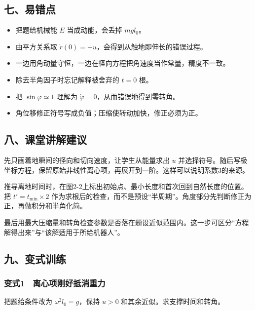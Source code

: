 \documentclass[12pt,a4paper,fontset=fandol]{ctexart}
\providecommand{\tightlist}{\setlength{\itemsep}{0pt}\setlength{\parskip}{0pt}}
\begin{document}
\subsection{七、易错点}\label{ux4e03ux6613ux9519ux70b9-1}

\begin{itemize}
\tightlist
\item
  把题给机械能 \(E\) 当成动能，会丢掉 \(mgl_0\)。
\item
  由平方关系取 \(\dot r(0)=+u\)，会得到从触地即伸长的错误过程。
\item
  一边用角动量守恒，一边在径向方程把角速度当作常量，精度不一致。
\item
  除去半角因子时忘记解释被舍弃的 \(t=0\) 根。
\item
  把 \(\sin\varphi\simeq1\) 理解为
  \(\dot\varphi=0\)，从而错误地得到零转角。
\item
  角位移修正符号写成负值；压缩使转动加快，修正必须为正。
\end{itemize}

\subsection{八、课堂讲解建议}\label{ux516bux8bfeux5802ux8bb2ux89e3ux5efaux8bae-1}

先只画着地瞬间的径向和切向速度，让学生从能量求出 \(u\)
并选择符号。随后写极坐标方程，保留原始非线性离心项，再展开到一阶。这样可以说明系数3的来源。

推导离地时间时，在图2-2上标出初始点、最小长度和首次回到自然长度的位置。把
\(t'=t_{\min}\times2\)
作为求根后的检查，而不是预设``半周期''。角度部分先判断修正为正，再做积分和半角化简。

最后用最大压缩量和转角检查参数是否落在题设近似范围内。这一步可区分``方程解得出来''与``该解适用于所给机器人''。

\subsection{九、变式训练}\label{ux4e5dux53d8ux5f0fux8badux7ec3-1}

\subsubsection{变式1　离心项刚好抵消重力}\label{ux53d8ux5f0f1-ux79bbux5fc3ux9879ux521aux597dux62b5ux6d88ux91cdux529b}

把题给条件改为 \(\omega^2l_0=g\)，保持 \(u>0\)
和其余近似。求支撑时间和转角。
\end{document}
